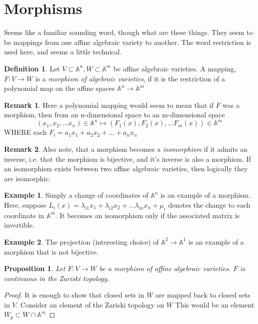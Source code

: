 \documentclass[12pt]{book}
\newtheorem{proposition}{Proposition}[section]
\theoremstyle{definition}
\newtheorem*{definition}{Definition}
\newtheorem{example}{Example}[chapter]
\newtheorem*{remark}{Remark}
\begin{document}
\section{Morphisms}
Seems like a familiar sounding word, though what are these things. They seem to be mappings from one affine algebraic variety to another. The word restriction is used here, and seems a little technical.

\begin{definition}
    Let $V \subset \mathbb{A}^n, W \subset \mathbb{A}^m$ be affine algebraic varieties. A mapping, $F: V \to W$ is a \textit{morphism of algebraic varieties}, if it is the restriction of a polynomial map on the affine spaces $\mathbb{A}^n \to \mathbb{A}^m$
\end{definition}
\begin{remark}
    Here a polynomial mapping would seem to mean that if $F$ was a morphism, then from an n-dimensional space to an m-dimensional space 
    $$ (x_1, x_2, \ldots x_n) \in \mathbb{A}^n \mapsto (F_1(x), F_2(x), \ldots F_m(x)) \in \mathbb{A}^m $$
    WHERE each $F_i = a_1x_1 + a_2x_2 + \ldots + a_nx_n$
\end{remark}
\begin{remark}
    Also note, that a morphism becomes a \textit{isomorphism} if it admits an inverse, i.e. that the morphism is bijective, and it's inverse is also a morphism. If an isomorphism exists between two affine algebraic varieties, then logically they are isomorphic.
\end{remark}
\begin{example}
    Simply a change of coordinates of $\mathbb{A}^n$ is an example of a morphism. Here, suppose $L_i(x) = \lambda_{i1}x_1 + \lambda_{i2}x_2 + \ldots \lambda_{in}x_n + \mu_i$ denotes the change to each coordinate in $\mathbb{A}^m$. It becomes an isomorphism only if the associated matrix is invertible.
\end{example}
\begin{example}
    The projection (interesting choice) of $\mathbb{A}^2 \to \mathbb{A}^1$ is an example of a morphism that is not bijective.
\end{example}
\begin{proposition}
    Let $F: V \to W$ be a morphism of affine algebraic varieties. $F$ is continuous in the Zariski topology.
\end{proposition}
\begin{proof}
    It is enough to show that closed sets in $W$ are mapped back to closed sets in $V$.
    Consider an element of the Zariski topology on $W$ This would be an element $W_p \subset W \cap \mathbb{A}^m$
\end{proof}
\end{document}
